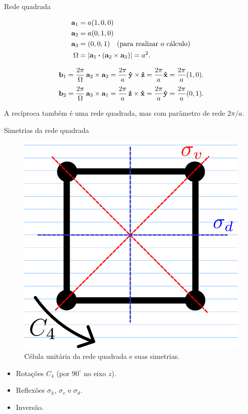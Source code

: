 \documentclass[aspectratio=169]{beamer}
\begin{document}
\begin{frame}{Rede quadrada}

\begin{equation*}
\begin{split}
\a_1 &= a(1,0,0) \\
\a_2 &= a(0,1,0) \\
\a_3 &= (0,0,1) \quad \text{(para realizar o cálculo)} \\
\Omega &= \abs{\a_1 \vdot (\a_2 \times \a_3)} = a^2.
\end{split}
\end{equation*}

\n

$$
\vb{b}_1 = \frac{2\pi}{\Omega} \, \vb{a}_2 \times \vb{a}_3 = \frac{2\pi}{a} \, \vu{y} \times \vu{z} = \frac{2\pi}{a} \vu{x} = \frac{2\pi}{a} (1, 0).
$$
$$
\vb{b}_2 = \frac{2\pi}{\Omega} \, \vb{a}_3 \times \vb{a}_1 = \frac{2\pi}{a} \, \vu{z} \times \vu{x} = \frac{2\pi}{a} \vu{y} = \frac{2\pi}{a} (0, 1).
$$

\n

A recíproca também é uma rede quadrada, mas com parâmetro de rede $\boxed{\displaystyle{2\pi/a}}$.

\end{frame}




\begin{frame}{Simetrias da rede quadrada}

\begin{figure}[H]
\centering
\includegraphics[width=0.3\linewidth]{fig/symm_square.png}
\caption{Célula unitária da rede quadrada e suas simetrias.}
\label{fig:symm_square}
\end{figure}

\begin{itemize}
\item Rotações $C_4$ (por $90^\circ$ no eixo $z$).
\n
\item Reflexões $\sigma_h$, $\sigma_v$ e $\sigma_d$.
\n
\item Inversão.
\end{itemize}

\end{frame}
\end{document}
